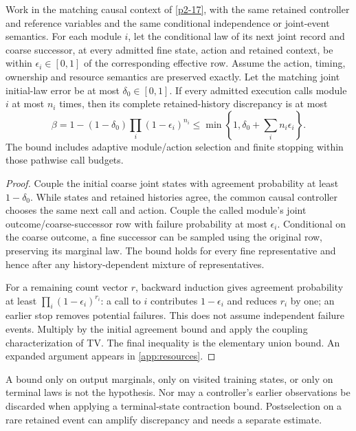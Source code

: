 \begin{theorem}\label{p2-19}
Work in the matching causal context of \cref{p2-17}, with the same retained controller and reference variables and the same conditional independence or joint-event semantics. For each module \(i\), let the conditional law of its next joint record and coarse successor, at every admitted fine state, action and retained context, be within \(\epsilon_i\in[0,1]\) of the corresponding effective row. Assume the action, timing, ownership and resource semantics are preserved exactly. Let the matching joint initial-law error be at most \(\delta_0\in[0,1]\). If every admitted execution calls module \(i\) at most \(n_i\) times, then its complete retained-history discrepancy is at most
\begin{equation}\label{eq:call-budget}
 \beta=1-(1-\delta_0)\prod_i(1-\epsilon_i)^{n_i}
 \le \min\left\{1,\delta_0+\sum_i n_i\epsilon_i\right\}.
\end{equation}
The bound includes adaptive module/action selection and finite stopping within those pathwise call budgets.
\end{theorem}
\begin{proof}
Couple the initial coarse joint states with agreement probability at least \(1-\delta_0\). While states and retained histories agree, the common causal controller chooses the same next call and action. Couple the called module's joint outcome/coarse-successor row with failure probability at most \(\epsilon_i\). Conditional on the coarse outcome, a fine successor can be sampled using the original row, preserving its marginal law. The bound holds for every fine representative and hence after any history-dependent mixture of representatives.

For a remaining count vector \(r\), backward induction gives agreement probability at least \(\prod_i(1-\epsilon_i)^{r_i}\): a call to \(i\) contributes \(1-\epsilon_i\) and reduces \(r_i\) by one; an earlier stop removes potential failures. This does not assume independent failure events. Multiply by the initial agreement bound and apply the coupling characterization of TV. The final inequality is the elementary union bound. An expanded argument appears in \cref{app:resources}.
\end{proof}
A bound only on output marginals, only on visited training states, or only on terminal laws is not the hypothesis. Nor may a controller's earlier observations be discarded when applying a terminal-state contraction bound. Postselection on a rare retained event can amplify discrepancy and needs a separate estimate.

